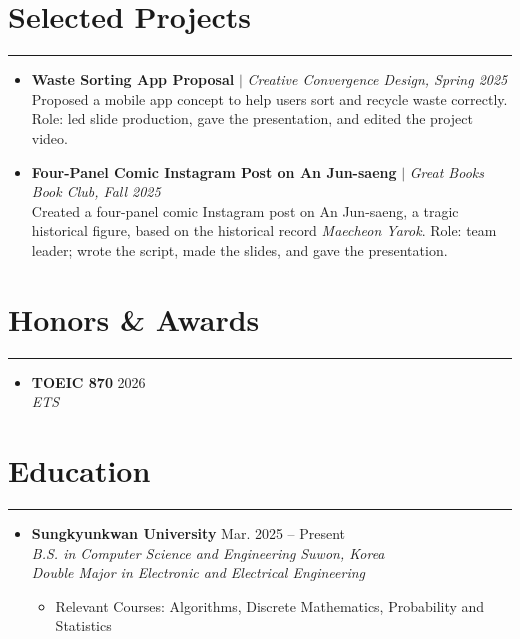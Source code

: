 \documentclass[letterpaper, 10pt]{article}
\begin{document}
\section*{Selected Projects}
\hrule
\vspace{4pt}
\begin{itemize}
    \item \textbf{Waste Sorting App Proposal} $|$ \textit{Creative Convergence Design, Spring 2025} \\
    Proposed a mobile app concept to help users sort and recycle waste correctly.
    Role: led slide production, gave the presentation, and edited the project video.
    \item \textbf{Four-Panel Comic Instagram Post on An Jun-saeng} $|$ \textit{Great Books Book Club, Fall 2025} \\
    Created a four-panel comic Instagram post on An Jun-saeng, a tragic historical figure, based on the historical record \textit{Maecheon Yarok}.
    Role: team leader; wrote the script, made the slides, and gave the presentation.
\end{itemize}

\section*{Honors \& Awards}
\hrule
\vspace{4pt}
\begin{itemize}
    \item \textbf{TOEIC 870} \hfill 2026 \\
    \textit{ETS}
\end{itemize}

\section*{Education}
\hrule
\vspace{4pt}
\begin{itemize}
    \item[]
        \textbf{Sungkyunkwan University} \hfill Mar. 2025 -- Present \\
        \textit{B.S. in Computer Science and Engineering} \hfill \textit{Suwon, Korea} \\
        \textit{Double Major in Electronic and Electrical Engineering}
        \begin{itemize}
            \item Relevant Courses: Algorithms, Discrete Mathematics, Probability and Statistics
        \end{itemize}
\end{itemize}

\end{document}
